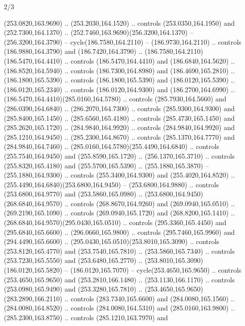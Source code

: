 \begin{flagdescription}{2/3}
\begin{scope}[xshift=0.5\flaglength,yshift=0.5\flagwidth,scale=\flagwidth/259.2]
\begin{scope}[y=0.8pt, x=0.8pt, yscale=-1,shift={(-243,-162)}]
      (253.0820,163.9690) .. (253.2030,164.1520) .. controls (253.0350,164.1950) and
      (252.7300,164.1370) .. (252.7460,163.9690)(256.3200,164.1370) --
      (256.3200,164.3790) -- cycle(186.7580,164.2110) -- (186.9730,164.2110) ..
      controls (186.9880,164.3790) and (186.7420,164.3790) ..
      (186.7580,164.2110)(186.5470,164.4410) .. controls (186.5470,164.4410) and
      (186.6840,164.5620) .. (186.8520,164.5940) .. controls (186.7300,164.8980) and
      (186.4690,165.2810) .. (186.1800,165.5390) .. controls (186.1800,165.5390) and
      (186.0120,165.5390) .. (186.0120,165.2340) .. controls (186.0120,164.9300) and
      (186.2700,164.6990) .. (186.5470,164.4410)(285.0160,164.5780) .. controls
      (285.7930,164.5660) and (286.0390,164.6840) .. (286.2070,164.7300) .. controls
      (285.9300,164.9300) and (285.8400,165.1450) .. (285.6560,165.4180) .. controls
      (285.4730,165.1450) and (285.2620,165.1720) .. (284.9840,164.9920) .. controls
      (284.9840,164.9920) and (285.1210,164.9450) .. (285.2300,164.8670) .. controls
      (285.1370,164.7770) and (284.9840,164.7460) ..
      (285.0160,164.5780)(255.4490,164.6840) .. controls (255.7540,164.9450) and
      (255.8590,165.1720) .. (256.1370,165.3710) .. controls (255.8320,165.4180) and
      (255.5700,165.5390) .. (255.1880,165.3870) -- (255.1880,164.9300) .. controls
      (255.3400,164.9300) and (255.4020,164.8520) ..
      (255.4490,164.6840)(253.6800,164.9450) -- (253.6800,164.9880) .. controls
      (253.6800,164.9770) and (253.5860,165.0980) ..
      (253.6800,164.9450)(268.6840,164.9570) .. controls (268.8670,164.9260) and
      (269.0940,165.0510) .. (269.2190,165.1090) .. controls (269.0940,165.1720) and
      (268.8200,165.1410) .. (268.6840,164.9570)(295.0430,165.0510) .. controls
      (295.3360,165.4450) and (295.6840,165.6600) .. (296.0660,165.9800) .. controls
      (295.7460,165.9960) and (294.4490,165.6600) ..
      (295.0430,165.0510)(253.8010,165.3090) .. controls (253.8120,165.4770) and
      (253.7540,165.7810) .. (253.5860,165.7340) .. controls (253.7230,165.5550) and
      (253.6480,165.2770) .. (253.8010,165.3090)(186.0120,165.5820) --
      (186.0120,165.7070) -- cycle(253.4650,165.9650) .. controls
      (253.4650,165.9650) and (253.2810,166.1480) .. (253.1130,166.1170) .. controls
      (253.0980,165.9490) and (253.3280,165.7810) ..
      (253.4650,165.9650)(283.2890,166.2110) .. controls (283.7340,165.6600) and
      (284.0080,165.1560) .. (284.0080,164.8520) .. controls (284.0080,164.5310) and
      (285.0160,163.9800) .. (285.2300,163.8750) .. controls (285.1210,163.7970) and

\end{scope}
\end{scope}
\end{flagdescription}
